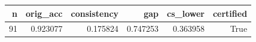 \begin{tabular}{rrrrrr}
\toprule
n & orig_acc & consistency & gap & cs_lower & certified \\
\midrule
91 & 0.923077 & 0.175824 & 0.747253 & 0.363958 & True \\
\bottomrule
\end{tabular}
